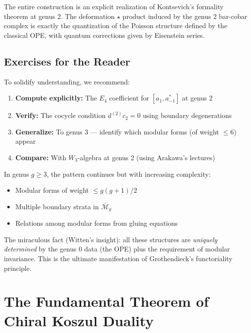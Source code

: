 \begin{remark}
The entire construction is an explicit realization of Kontsevich's formality theorem
at genus 2. The deformation $\star$ product induced by the genus 2 bar-cobar complex
is exactly the quantization of the Poisson structure defined by the classical OPE,
with quantum corrections given by Eisenstein series.
\end{remark}

\subsection{Exercises for the Reader}

To solidify understanding, we recommend:

\begin{enumerate}
\item \textbf{Compute explicitly:} The $E_4$ coefficient for $[a_1, a^*_{-1}]$ at genus 2

\item \textbf{Verify:} The cocycle condition $d^{(2)} c_2 = 0$ using boundary degenerations

\item \textbf{Generalize:} To genus 3 --- identify which modular forms (of weight $\leq 6$) appear

\item \textbf{Compare:} With $W_3$-algebra at genus 2 (using Arakawa's lectures)
\end{enumerate}

\begin{remark}
In genus $g \geq 3$, the pattern continues but with increasing complexity:
\begin{itemize}
\item Modular forms of weight $\leq g(g+1)/2$
\item Multiple boundary strata in $\overline{\mathcal{M}}_g$
\item Relations among modular forms from gluing equations
\end{itemize}

The miraculous fact (Witten's insight): all these structures are \emph{uniquely determined}
by the genus 0 data (the OPE) plus the requirement of modular invariance. This is the
ultimate manifestation of Grothendieck's functoriality principle.
\end{remark}

\section{The Fundamental Theorem of Chiral Koszul Duality}
\label{sec:fundamental-theorem-koszul}

